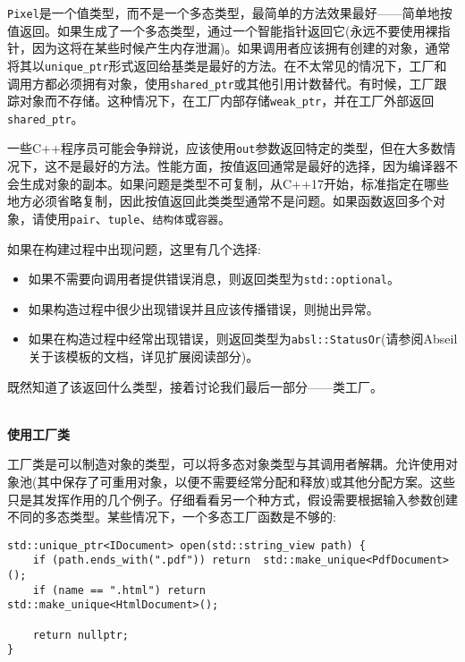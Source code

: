 \texttt{Pixel}是一个值类型，而不是一个多态类型，最简单的方法效果最好——简单地按值返回。如果生成了一个多态类型，通过一个智能指针返回它(永远不要使用裸指针，因为这将在某些时候产生内存泄漏)。如果调用者应该拥有创建的对象，通常将其以\texttt{unique\_ptr}形式返回给基类是最好的方法。在不太常见的情况下，工厂和调用方都必须拥有对象，使用\texttt{shared\_ptr}或其他引用计数替代。有时候，工厂跟踪对象而不存储。这种情况下，在工厂内部存储\texttt{weak\_ptr}，并在工厂外部返回\texttt{shared\_ptr}。

一些C++程序员可能会争辩说，应该使用\texttt{out}参数返回特定的类型，但在大多数情况下，这不是最好的方法。性能方面，按值返回通常是最好的选择，因为编译器不会生成对象的副本。如果问题是类型不可复制，从C++17开始，标准指定在哪些地方必须省略复制，因此按值返回此类类型通常不是问题。如果函数返回多个对象，请使用\texttt{pair}、\texttt{tuple}、\texttt{结构体}或\texttt{容器}。

如果在构建过程中出现问题，这里有几个选择:

\begin{itemize}
\item 
如果不需要向调用者提供错误消息，则返回类型为\texttt{std::optional}。

\item 
如果构造过程中很少出现错误并且应该传播错误，则抛出异常。

\item 
如果在构造过程中经常出现错误，则返回类型为\texttt{absl::StatusOr}(请参阅Abseil关于该模板的文档，详见扩展阅读部分)。
\end{itemize}

既然知道了该返回什么类型，接着讨论我们最后一部分——类工厂。

\hspace*{\fill} \\ %
\noindent
\textbf{使用工厂类}

工厂类是可以制造对象的类型，可以将多态对象类型与其调用者解耦。允许使用对象池(其中保存了可重用对象，以便不需要经常分配和释放)或其他分配方案。这些只是其发挥作用的几个例子。仔细看看另一个种方式，假设需要根据输入参数创建不同的多态类型。某些情况下，一个多态工厂函数是不够的:

\begin{lstlisting}[style=styleCXX]
std::unique_ptr<IDocument> open(std::string_view path) {
	if (path.ends_with(".pdf")) return 	std::make_unique<PdfDocument>();
	if (name == ".html") return 			std::make_unique<HtmlDocument>();
	
	return nullptr;
}
\end{lstlisting}

